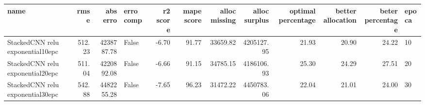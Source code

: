 \begin{tabular}{lrrlrrrrrrrl}
\toprule
name & rmse & abs erro & erro comp & r2 score & mape score & alloc missing & alloc surplus & optimal percentage & better allocation & beter percentage & epoca \\
\midrule
StackedCNN relu exponential10epc & 512.23 & 4238787.78 & False & -6.70 & 91.77 & 33659.82 & 4205127.95 & 21.93 & 20.90 & 24.22 & 10 \\
StackedCNN relu exponential20epc & 511.04 & 4220892.08 & False & -6.66 & 91.15 & 34785.15 & 4186106.93 & 25.30 & 24.29 & 27.51 & 20 \\
StackedCNN relu exponential30epc & 542.88 & 4482255.28 & False & -7.65 & 96.23 & 31472.22 & 4450783.06 & 22.04 & 21.01 & 24.00 & 30 \\
\bottomrule
\end{tabular}
